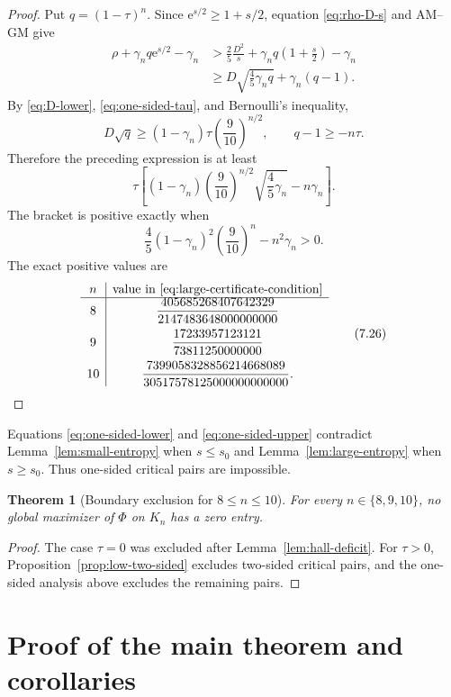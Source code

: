 \documentclass[11pt]{article}
\newtheorem{theorem}{Theorem}[section]
\theoremstyle{definition}
\newcommand{\1}{\mathbf{1}}
\newcommand{\e}{\mathrm{e}}
\begin{document}
\begin{proof}
Put $q=(1-\tau)^n$.  Since $\e^{s/2}\ge1+s/2$, equation \eqref{eq:rho-D-s} and AM--GM give
\[
 \begin{aligned}
 \rho+\gamma_nq\e^{s/2}-\gamma_n
 &>\frac25\frac{D^2}{s}
   +\gamma_nq\left(1+\frac{s}{2}\right)-\gamma_n\\
 &\ge D\sqrt{\frac45\gamma_nq}+\gamma_n(q-1).
 \end{aligned}
\]
By \eqref{eq:D-lower}, \eqref{eq:one-sided-tau}, and Bernoulli's inequality,
\[
 D\sqrt q
 \ge(1-\gamma_n)\tau\left(\frac9{10}\right)^{n/2},
 \qquad
 q-1\ge-n\tau.
\]
Therefore the preceding expression is at least
\[
 \tau\left[
 (1-\gamma_n)\left(\frac9{10}\right)^{n/2}
 \sqrt{\frac45\gamma_n}
 -n\gamma_n
 \right].
\]
The bracket is positive exactly when
\[
 \frac45(1-\gamma_n)^2\left(\frac9{10}\right)^n
 -n^2\gamma_n>0.
 \tag{7.25}\label{eq:large-certificate-condition}
\]
The exact positive values are
\[
\begin{array}{c|c}
 n&\text{value in \eqref{eq:large-certificate-condition}}\\ \hline
 8&\dfrac{405685268407642329}{2147483648000000000}\\[3mm]
 9&\dfrac{17233957123121}{73811250000000}\\[3mm]
 10&\dfrac{7399058328856214668089}{30517578125000000000000}.
\end{array}
\tag{7.26}\label{eq:large-certificates}
\]
\end{proof}

Equations \eqref{eq:one-sided-lower} and \eqref{eq:one-sided-upper} contradict Lemma~\ref{lem:small-entropy} when $s\le s_0$ and Lemma~\ref{lem:large-entropy} when $s\ge s_0$.  Thus one-sided critical pairs are impossible.

\begin{theorem}[Boundary exclusion for $8\le n\le10$]\label{thm:boundary-low}
For every $n\in\{8,9,10\}$, no global maximizer of $\Phi$ on $K_n$ has a zero entry.
\end{theorem}

\begin{proof}
The case $\tau=0$ was excluded after Lemma~\ref{lem:hall-deficit}.  For $\tau>0$, Proposition~\ref{prop:low-two-sided} excludes two-sided critical pairs, and the one-sided analysis above excludes the remaining pairs.
\end{proof}

\section{Proof of the main theorem and corollaries}\label{sec:completion}
\end{document}
